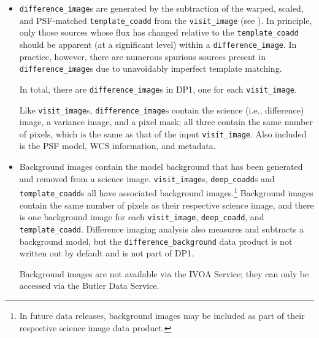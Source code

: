 \begin{itemize}

\item \texttt{difference\_image}s are generated by the subtraction of the warped, scaled, and PSF-matched \texttt{template\_coadd} from the \texttt{visit\_image} (see ). In principle, only those sources whose \gls{flux} has changed relative to the \texttt{template\_coadd} should be apparent (at a significant level) within a \texttt{difference\_image}. In practice, however, there are numerous spurious sources present in \texttt{difference\_image}s due to unavoidably imperfect template matching.

In total, there are \ndifferenceimages \texttt{difference\_image}s in \gls{DP1}, one for each \texttt{visit\_image}.

Like \texttt{visit\_image}s, \texttt{difference\_image}s contain the science (i.e., difference) image, a variance image, and a pixel mask; all three contain the same number of pixels, which is the same as that of the input \texttt{visit\_image}. Also included is the PSF model, \gls{WCS} information, and metadata.


\item Background images contain the model \gls{background} that has been generated and removed from a science image.
\texttt{visit\_image}s, \texttt{deep\_coadd}s and \texttt{template\_coadd}s all have associated \gls{background} images.\footnote{In future data releases, \gls{background} images may be included as part of their respective science image data product.} Background images contain the same number of pixels as their respective science image, and there is one \gls{background} image for each \texttt{visit\_image}, \texttt{deep\_coadd}, and \texttt{template\_coadd}.
Difference imaging analysis also measures and subtracts a background model, but the \texttt{difference\_background} data product is not written out by default and is not part of \gls{DP1}.

Background images are not available via the IVOA Service; they can only be accessed via the \gls{Butler} Data Service.




\end{itemize}

